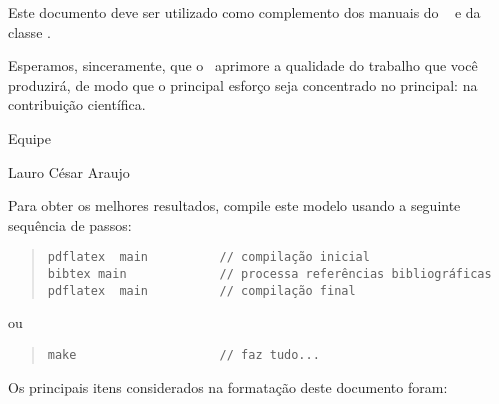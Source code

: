 \documentclass[12pt,openright,oneside,a4paper,chapter=TITLE,section=TITLE,subsection=Title,english,french,spanish,portugues,sumario=tradicional]{04-class-files/abntex2}
\begin{document}
Este documento deve ser utilizado como complemento dos manuais do \abnTeX~
\cite{abntex2classe,abntex2cite,abntex2cite-alf} e da classe \textcite{memoir}
\cite{memoir}.

Esperamos, sinceramente, que o \abnTeX~aprimore a qualidade do trabalho que
você produzirá, de modo que o principal esforço seja concentrado no principal:
na contribuição científica.

Equipe \abnTeX 

Lauro César Araujo

Para obter os melhores resultados, compile este modelo usando a seguinte sequência de passos:

\begin{quote}
\begin{footnotesize}
\begin{verbatim}
pdflatex  main          // compilação inicial
bibtex main             // processa referências bibliográficas
pdflatex  main          // compilação final
\end{verbatim}
\end{footnotesize}
\end{quote}

ou

\begin{quote}
\begin{footnotesize}
\begin{verbatim}
make                    // faz tudo...
\end{verbatim}
\end{footnotesize}
\end{quote}

Os principais itens considerados na formatação deste documento foram:
\end{document}

